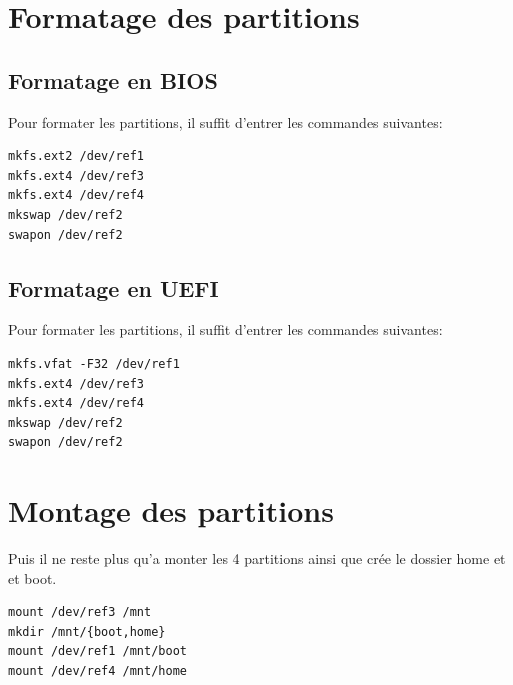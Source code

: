 \documentclass[a4paper]{book}
\begin{document}
\section{Formatage des partitions}
\subsection{Formatage en BIOS}
Pour formater les partitions, il suffit d'entrer les commandes suivantes:\\
\begin{lstlisting}
mkfs.ext2 /dev/ref1
mkfs.ext4 /dev/ref3
mkfs.ext4 /dev/ref4
mkswap /dev/ref2
swapon /dev/ref2
\end{lstlisting}
\subsection{Formatage en UEFI}
Pour formater les partitions, il suffit d'entrer les commandes suivantes:\\
\begin{lstlisting}
mkfs.vfat -F32 /dev/ref1
mkfs.ext4 /dev/ref3
mkfs.ext4 /dev/ref4
mkswap /dev/ref2
swapon /dev/ref2
\end{lstlisting}
\section{Montage des partitions}
Puis il ne reste plus qu'a monter les 4 partitions ainsi que crée le dossier
home et et boot.\\
\begin{lstlisting}
mount /dev/ref3 /mnt
mkdir /mnt/{boot,home}
mount /dev/ref1 /mnt/boot
mount /dev/ref4 /mnt/home
\end{lstlisting}
\end{document}
